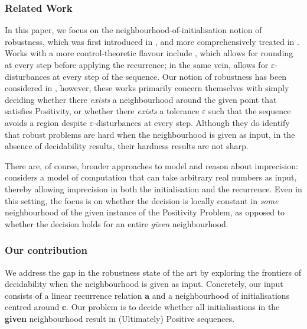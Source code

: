 \subsubsection*{Related Work} 
In this paper, we focus on the neighbourhood-of-initialisation notion of robustness, which was first introduced in \cite{originalstacs}, and more comprehensively treated in \cite{originalarxiv}.  Works with a more control-theoretic flavour include \cite{rounding20}, which allows for rounding at every step before applying the recurrence; in the same vein, \cite{pseudo21} allows for $\varepsilon$-disturbances at every step of the sequence. Our notion of robustness has been considered in \cite{originalstacs,originalarxiv,pseudo21}, however, these works primarily concern themselves with simply deciding whether there \textit{exists} a neighbourhood around the given point that satisfies Positivity, or whether there \textit{exists} a tolerance $\varepsilon$ such that the sequence avoids a region despite $\varepsilon$-disturbances at every step. Although they do identify that robust problems are hard when the neighbourhood is given as input, in the absence of decidability results, their hardness results are not sharp. 

There are, of course, broader approaches to model and reason about imprecision: \cite{N21} considers a model of computation that can take arbitrary real numbers as input, thereby allowing imprecision in both the initialisation and the recurrence. Even in this setting, the focus is on whether the decision is locally constant in \textit{some} neighbourhood of the given instance of the Positivity Problem, as opposed to whether the decision holds for an entire \textit{given} neighbourhood.

\subsubsection*{Our contribution}
We address the gap in the robustness state of the art by exploring the frontiers of decidability when the neighbourhood is given as input. Concretely, our input consists of a linear recurrence relation $\mathbf{a}$ and a neighbourhood of initialisations centred around $\mathbf{c}$. Our problem is to decide whether all initialisations in the \textbf{given} neighbourhood result in (Ultimately) Positive sequences. 

